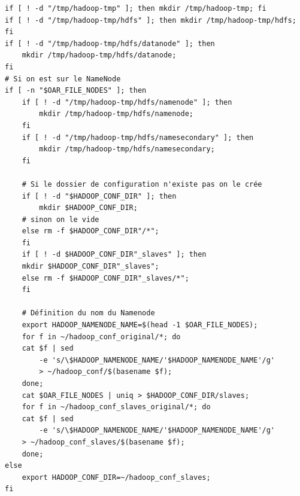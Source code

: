 \begin{verbatim}
if [ ! -d "/tmp/hadoop-tmp" ]; then mkdir /tmp/hadoop-tmp; fi
if [ ! -d "/tmp/hadoop-tmp/hdfs" ]; then mkdir /tmp/hadoop-tmp/hdfs; fi
if [ ! -d "/tmp/hadoop-tmp/hdfs/datanode" ]; then
    mkdir /tmp/hadoop-tmp/hdfs/datanode;
fi
# Si on est sur le NameNode
if [ -n "$OAR_FILE_NODES" ]; then
    if [ ! -d "/tmp/hadoop-tmp/hdfs/namenode" ]; then
        mkdir /tmp/hadoop-tmp/hdfs/namenode;
    fi
    if [ ! -d "/tmp/hadoop-tmp/hdfs/namesecondary" ]; then
        mkdir /tmp/hadoop-tmp/hdfs/namesecondary;
    fi
    
    # Si le dossier de configuration n'existe pas on le crée
    if [ ! -d "$HADOOP_CONF_DIR" ]; then 
        mkdir $HADOOP_CONF_DIR;
    # sinon on le vide
    else rm -f $HADOOP_CONF_DIR"/*";
    fi
    if [ ! -d $HADOOP_CONF_DIR"_slaves" ]; then
	mkdir $HADOOP_CONF_DIR"_slaves";
    else rm -f $HADOOP_CONF_DIR"_slaves/*";
    fi

    # Définition du nom du Namenode
    export HADOOP_NAMENODE_NAME=$(head -1 $OAR_FILE_NODES);
    for f in ~/hadoop_conf_original/*; do
	cat $f | sed 
        -e 's/\$HADOOP_NAMENODE_NAME/'$HADOOP_NAMENODE_NAME'/g' 
        > ~/hadoop_conf/$(basename $f);
    done;
    cat $OAR_FILE_NODES | uniq > $HADOOP_CONF_DIR/slaves;
    for f in ~/hadoop_conf_slaves_original/*; do
	cat $f | sed 
        -e 's/\$HADOOP_NAMENODE_NAME/'$HADOOP_NAMENODE_NAME'/g'
	> ~/hadoop_conf_slaves/$(basename $f);
    done;
else
    export HADOOP_CONF_DIR=~/hadoop_conf_slaves;
fi
\end{verbatim}

